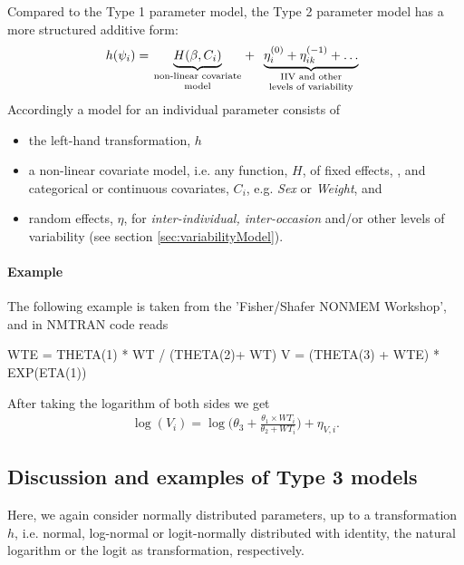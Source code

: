 Compared to the Type 1 parameter model, the Type 2 parameter model has a more structured additive form:
\begin{align*}
h(\psi_i) =
\underbrace{H(\beta, C_i)}_{\text{\parbox{2.5cm}{\centering non-linear covariate\\[-4pt] model}}}
+ \underbrace{\eta_i^{(0)}+ \eta_{ik}^{(-1)} + \dots}_{\text{\parbox{3cm}{\centering IIV and other\\[-4pt] levels of variability}}}
\end{align*}
Accordingly a model for an individual parameter consists of
\begin{itemize}
\item
the left-hand transformation, $h$
\item
a non-linear covariate model, i.e. any function, $H$, of fixed effects, \var{\beta}, and categorical or continuous covariates, $C_i$, e.g. \textit{Sex} or \textit{Weight}, and
\item
random effects, $\eta$, for \textit{inter-individual, inter-occasion} and/or other levels of variability (see section \ref{sec:variabilityModel}).
\end{itemize}

\paragraph{Example}
The following example is taken from the 'Fisher/Shafer NONMEM Workshop', and in NMTRAN code reads
\begin{xmlcode}
	WTE = THETA(1) * WT / (THETA(2)+ WT)
	V = (THETA(3) + WTE) * EXP(ETA(1))
\end{xmlcode}
After taking the logarithm of both sides we get
\begin{align*}
\log(V_i) = \log\Big(\theta_3 + \frac{\theta_1 \times WT_i}{\theta_2 + WT_i}\Big) + \eta_{V,i}.
\end{align*}

\subsection{Discussion and examples of Type 3 models}
\label{subsec:paramModelType3}
Here, we again consider normally distributed parameters, up to a transformation $h$, i.e. normal, log-normal or logit-normally distributed with identity, the natural logarithm or the logit as transformation, respectively.


